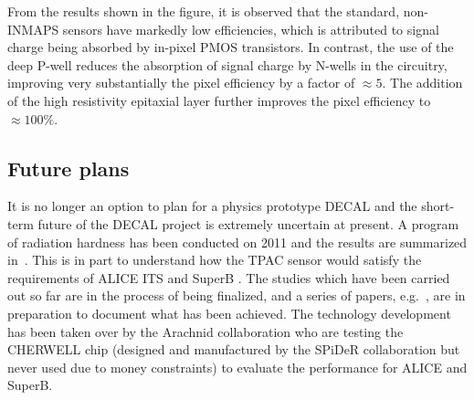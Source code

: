 From the results shown in the figure, it is observed that the standard, non-INMAPS sensors have markedly low efficiencies, which is attributed to signal charge being absorbed by in-pixel PMOS transistors. In contrast, the use of the deep P-well reduces the absorption of signal charge by N-wells in the circuitry, improving very substantially the pixel efficiency by a factor of $\approx 5$. The addition of the high resistivity epitaxial layer further improves the pixel efficiency to $\approx 100\%$.

\subsection{Future plans}
It is no longer an option to plan for a physics prototype DECAL and the short-term future of the DECAL project is extremely uncertain at present. A program of radiation hardness has been conducted on 2011 and the results are summarized in~\cite{Price:2012vta,Price:2013js}. This is in part to understand how the TPAC sensor would satisfy the requirements of ALICE ITS and SuperB . The studies which have been carried out so far are in the process of being finalized, and a series of papers, e.g.~\cite{Ballin:2011jq}, are in preparation to document what has been achieved. The technology development has been taken over by the Arachnid collaboration who are testing the CHERWELL chip (designed and manufactured by the SPiDeR collaboration but never used due to money constraints) to evaluate the performance for ALICE and SuperB.
